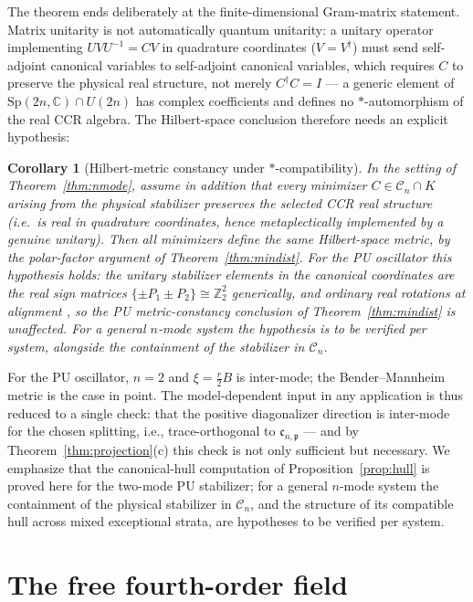 \documentclass[11pt]{article}
\newtheorem{corollary}[theorem]{Corollary}
\theoremstyle{definition}
\theoremstyle{remark}
\newcommand{\C}{\mathbb{C}}
\newcommand{\Z}{\mathbb{Z}}
\newcommand{\Sp}{\mathrm{Sp}}
\newcommand{\dg}{\dagger}
\begin{document}
The theorem ends deliberately at the finite-dimensional Gram-matrix
statement.  Matrix unitarity is not automatically quantum unitarity: a
unitary operator implementing $UVU^{-1}=CV$ in quadrature coordinates
($V=V^{\dg}$) must send self-adjoint canonical variables to self-adjoint
canonical variables, which requires $C$ to preserve the physical real
structure, not merely $C^{\dg}C=I$ --- a generic element of
$\Sp(2n,\C)\cap U(2n)$ has complex coefficients and defines no
$*$-automorphism of the real CCR algebra.  The Hilbert-space conclusion
therefore needs an explicit hypothesis:

\begin{corollary}[Hilbert-metric constancy under $*$-compatibility]
\label{cor:starcompat}
In the setting of Theorem~\ref{thm:nmode}, assume in addition that every
minimizer $C\in\mathcal C_n\cap K$ arising from the physical stabilizer
preserves the selected CCR real structure (i.e.\ is real in quadrature
coordinates, hence metaplectically implemented by a genuine unitary).
Then all minimizers define the same Hilbert-space metric, by the
polar-factor argument of Theorem~\ref{thm:mindist}.  For the PU
oscillator this hypothesis holds: the unitary stabilizer elements in the
canonical coordinates are the real sign matrices
$\{\pm P_1\pm P_2\}\cong\Z_2^2$ generically, and ordinary real rotations
at alignment \cite{companion}, so the PU metric-constancy conclusion of
Theorem~\ref{thm:mindist} is unaffected.  For a general $n$-mode system
the hypothesis is to be verified per system, alongside the containment
of the stabilizer in $\mathcal C_n$.
\end{corollary}

For the PU oscillator, $n=2$ and $\xi=\tfrac r2B$ is inter-mode; the
Bender--Mannheim metric is the case in point.  The model-dependent input in
any application is thus reduced to a single check: that the positive
diagonalizer direction is inter-mode for the chosen splitting, i.e.,
trace-orthogonal to $\mathfrak c_{n,\mathfrak p}$ --- and by
Theorem~\ref{thm:projection}(c) this check is not only sufficient but
necessary.  We emphasize that the canonical-hull computation of
Proposition~\ref{prop:hull} is proved here for the two-mode PU stabilizer;
for a general $n$-mode system the containment of the physical stabilizer in
$\mathcal C_n$, and the structure of its compatible hull across mixed
exceptional strata, are hypotheses to be verified per system.

\section{The free fourth-order field}\label{sec:field}
\end{document}
